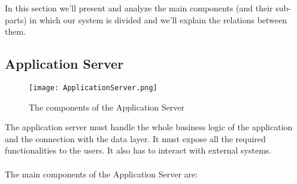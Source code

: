 In this section we'll present and analyze the main components (and their sub-parts) in which our system is divided and we'll explain the relations between them.
		
\subsection{Application Server}
\label{subsect:Application Server}
	\begin{figure}[H]
		\begin{center}
			\hspace*{-60pt}
			\texttt{[image: ApplicationServer.png]}
		\end{center}
		\caption{The components of the Application Server}
	\end{figure}
	The application server must handle the whole business logic of the application and the connection with the data layer. It must expose all the required functionalities to the users. It also has to interact with external systems. \\ \\
The main components of the Application Server are:
